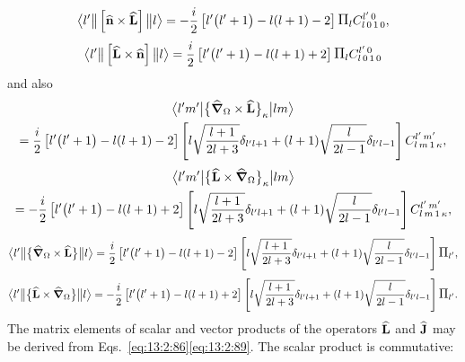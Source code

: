 \begin{equation*}
\braOketred{ l^{\prime}}{\left[\widehat{\vect{n}} \times \widehat{\vect{L}}\right]}{l}=-\frac{i}{2}\left[l^{\prime}\bigl(l^{\prime}+1\bigr)-l(l+1)-2\right] \Fact{l}
\clebsch{l}{0}{1}{0}{l^{\prime}}{0},
\end{equation*}
\begin{equation*}
\braOketred{ l^{\prime}}{\left[\widehat{\vect{L}} \times \widehat{\vect{n}}\right]}{l}=\frac{i}{2}\left[l^{\prime}\bigl(l^{\prime}+1\bigr)-l(l+1)+2\right] \Fact{l}
\clebsch{l}{0}{1}{0}{l^{\prime}}{0}
\end{equation*}
and also
\begin{multline}
\bigl\langle  l^{\prime} m^{\prime} \big| \bigl\{\widehat{\boldsymbol{\nabla}}_{\Omega} \times \widehat{\mathbf{L}}\bigr\}_{\kappa} \big| l m \bigr\rangle \\
=\frac{i}{2}\left[l^{\prime}\bigl(l^{\prime}+1\bigr)-l(l+1)-2\right]\left[l \sqrt{\frac{l+1}{2 l+3}} \delta_{l^{\prime} l+1}+(l+1) \sqrt{\frac{l}{2 l-1}} \delta_{l^{\prime} l-1}\right]
C_{l\,m\,1\,\kappa}^{l^{\prime}\,m^{\prime}},  \label{eq:13:2:161}
\end{multline}
\begin{multline}
\bigl\langle  l^{\prime} m^{\prime} \big| \bigl\{\widehat{\mathbf{L}} \times \widehat{\boldsymbol{\nabla}}_{\Omega}\bigr\}_{\kappa} \big| l m \bigr\rangle \\
=-\frac{i}{2}\left[l^{\prime}\bigl(l^{\prime}+1\bigr)-l(l+1)+2\right]\left[l \sqrt{\frac{l+1}{2 l+3}} \delta_{l^{\prime} l+1}+(l+1) \sqrt{\frac{l}{2 l-1}} \delta_{l^{\prime} l-1}\right]
C_{l\,m\,1\,\kappa}^{l^{\prime}\,m^{\prime}} , \label{eq:13:2:162}
\end{multline}
\begin{equation*}
\braOketred{ l^{\prime}}{\bigl\{\delop_{\Omega} \times \widehat{\vect{L}}\bigr\}}{l}
=\frac{i}{2}\left[l^{\prime}\bigl(l^{\prime}+1\bigr)-l(l+1)-2\right]\left[l \sqrt{\frac{l+1}{2 l+3}} \delta_{l^{\prime} l+1}+(l+1) \sqrt{\frac{l}{2 l-1}} \delta_{l^{\prime} l-1}\right] \Fact{l^{\prime}},
\end{equation*}
\begin{equation*}
\braOketred{ l^{\prime}}{\bigl\{\widehat{\vect{L}} \times \delop_{\Omega}\bigr\}}{l}
=-\frac{i}{2}\left[l^{\prime}\bigl(l^{\prime}+1\bigr)-l(l+1)+2\right]\left[l \sqrt{\frac{l+1}{2 l+3}} \delta_{l^{\prime} l+1}+(l+1) \sqrt{\frac{l}{2 l-1}} \delta_{l^{\prime} l-1}\right] \Fact{l^{\prime}}.
\end{equation*}
The matrix elements of scalar and vector products of the operators \(\widehat{\mathbf{L}}\) and \(\widehat{\mathbf{J}}\) may be derived from Eqs.~\eqref{eq:13:2:86}\eqref{eq:13:2:89}. The scalar product is commutative:

